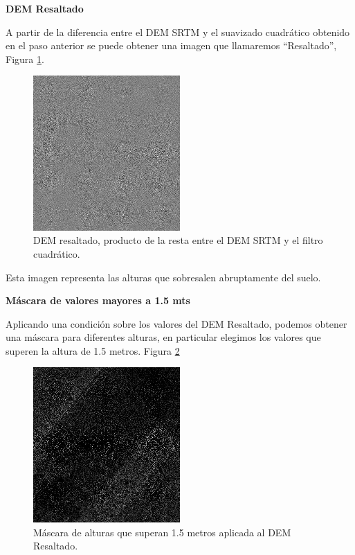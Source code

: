 \documentclass[10pt,a4paper, twoside]{report}
\begin{document}
\textbf{DEM Resaltado}
\label{resta}

A partir de la diferencia entre el DEM SRTM y el suavizado cuadrático obtenido en el paso anterior se puede obtener una imagen que llamaremos "`Resaltado"', Figura \ref{demResaltado}.

\begin{figure}[H]
   \centering      
   \includegraphics[width=0.5\textwidth]{imagenes/demResaltado.jpg}
 \caption{DEM resaltado, producto de la resta entre el DEM SRTM y el filtro cuadrático.}
 \label{demResaltado}
\end{figure}

Esta imagen representa las alturas que sobresalen abruptamente del suelo.

\textbf{Máscara de valores mayores a 1.5 mts}

Aplicando una condición sobre los valores del DEM Resaltado, podemos obtener una máscara para diferentes alturas, en particular elegimos los valores que superen la altura de 1.5 metros. Figura \ref{maskTrees}

\begin{figure}[H]
   \centering      
   \includegraphics[width=0.5\textwidth]{imagenes/maskTrees.jpg}
 \caption{Máscara de alturas que superan 1.5 metros aplicada al DEM Resaltado.}
 \label{maskTrees}
\end{figure}
\end{document}
